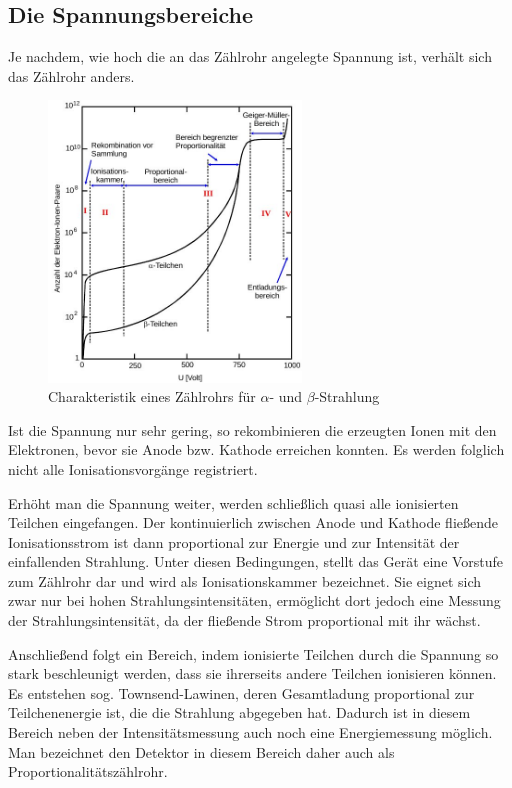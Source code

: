 \subsection{Die Spannungsbereiche}
\label{sec_spannungsbereiche}
Je nachdem, wie hoch die an das Zählrohr angelegte Spannung ist, verhält sich das Zählrohr anders.

\begin{figure}[h]
	\includegraphics[width=0.6\textwidth]{pics/charak.jpg}
	\caption{Charakteristik eines Zählrohrs für $\alpha$- und $\beta$-Strahlung}
\end{figure}

Ist die Spannung nur sehr gering, so rekombinieren die erzeugten Ionen mit den Elektronen, bevor sie Anode bzw. Kathode erreichen konnten. Es werden folglich nicht alle Ionisationsvorgänge registriert.

Erhöht man die Spannung weiter, werden schließlich quasi alle ionisierten Teilchen eingefangen. Der kontinuierlich zwischen Anode und Kathode fließende Ionisationsstrom ist dann proportional zur Energie und zur Intensität der einfallenden Strahlung. Unter diesen Bedingungen, stellt das Gerät eine Vorstufe zum Zählrohr dar und wird als Ionisationskammer bezeichnet. Sie eignet sich zwar nur bei hohen Strahlungsintensitäten, ermöglicht dort jedoch eine Messung der Strahlungsintensität, da der fließende Strom proportional mit ihr wächst.

Anschließend folgt ein Bereich, indem ionisierte Teilchen durch die Spannung so stark  beschleunigt werden, dass sie ihrerseits andere Teilchen ionisieren können. Es entstehen sog. Townsend-Lawinen, deren Gesamtladung proportional zur Teilchenenergie ist, die die Strahlung abgegeben hat. Dadurch ist in diesem Bereich neben der Intensitätsmessung auch noch eine Energiemessung möglich. Man bezeichnet den Detektor in diesem Bereich daher auch als Proportionalitätszählrohr.

